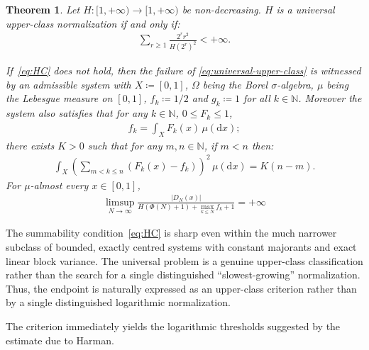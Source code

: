 \documentclass[12pt,reqno]{amsart}
\theoremstyle{definition}
\theoremstyle{plain}
\newtheorem{thm}{Theorem}
\begin{document}
\begin{thm}\label{thm:general-normalization}
Let $H:[1,+\infty)\to[1,+\infty)$ be non-decreasing. $H$ is a universal upper-class normalization if and only if:
\begin{align}
\label{eq:HC}
    \sum_{r\geq1} \frac{2^r r^2}{H(2^r)^2} <+\infty.
\end{align}

If~\eqref{eq:HC} does not hold, then the failure of \eqref{eq:universal-upper-class} is witnessed by an admissible system with $X\coloneqq[0,1]$, $\Omega$ being the Borel $\sigma$-algebra, $\mu$ being the Lebesgue measure on $[0,1]$, $f_k\coloneqq1/2$ and $g_k\coloneqq1$ for all $k\in\mathbb{N}$. Moreover the system also satisfies that for any $k\in\mathbb{N}$, $0\leq F_k\leq1$,
\begin{align*}
    f_k=\int_X F_k(x)\,\mu(\mathrm dx);
\end{align*}
there exists $K>0$ such that for any $m,n\in\mathbb{N}$, if $m<n$ then:
\begin{align}
\label{eq:exact-linear-variance}
    \int_X \left( \sum_{m<k\leq n}(F_k(x)-f_k) \right)^2 \,\mu(\mathrm dx)
    = K(n-m).
\end{align}
For $\mu$-almost every $x\in[0,1]$,
\begin{align}
\label{eq:counterexample-limsup}
    \limsup_{N\to\infty} \frac{|D_N(x)|}{ H(\Phi(N)+1)+\max_{k\leq N}f_k+1 }
    =+\infty
\end{align} 
\end{thm}

The summability condition~\eqref{eq:HC} is sharp even within the much narrower subclass of bounded, exactly centred systems with constant majorants and exact linear block variance. The universal problem is a genuine upper-class classification rather than the search for a single distinguished ``slowest-growing'' normalization. Thus, the endpoint is naturally expressed as an upper-class criterion rather than by a single distinguished logarithmic normalization.

The criterion immediately yields the logarithmic thresholds suggested by the estimate due to Harman.
\end{document}
